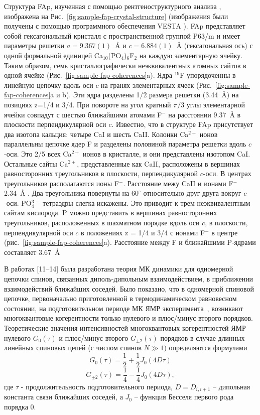 Структура FAp, изученная с помощью рентгеноструктурного анализа \cite{Elliott1994}, изображена на Рис.~\ref{fig:sample-fap-crystal-structure} (изображения были получены с помощью программного обеспечения VESTA \cite{vesta}).
FAp представляет собой гексагональный кристалл с пространственной группой P63/m
и имеет параметры решетки $a=9.367(1)$~\r{A} и $c=6.884(1)$~\r{A}
(гексагональная ось) с одной формальной единицей Ca$_{10}$(PO$_4$)$_6$F$_2$ на каждую элементарную ячейку.
Таким образом, семь кристаллографически неэквивалентных атомных сайтов в одной ячейке (Рис.~\ref{fig:sample-fap-coherences}a).
Ядра $^{19}$F упорядоченны в линейную цепочку вдоль оси $c$ на гранях элементарных ячеек (Рис.~\ref{fig:sample-fap-coherences}a и b). Эти ядра разделены 1/2 размера решетки (3.44~\r{A}) на позициях z=1/4 и 3/4. При повороте на угол кратный $\pi/3$ углы элементарной ячейки совпадут с шестью ближайшими атомами F$^-$ на расстоянии 9.37~\r{A}   в плоскости перпендикулярной оси $c$. Известно, что в структуре FAp присутствует два изотопа кальция: четыре CaI и шесть CaII. Колонки Ca$^{2+}$ ионов параллельны цепочке ядер F и разделены половиной параметра решетки вдоль $c$-оси. Это 2/5 всех Ca$^{2+}$ ионов в кристалле, и они представлены изотопом CaI. Остальные сайты Ca$^{2+}$, представленные как CaII, расположены в вершинах равносторонних треугольников в плоскости, перпендикулярной $c$-оси. В центрах треугольников располагаются ионы F$^-$. Расстояние межу CaII и ионами F$^-$ 2.34~\r{A}  . Два треугольника повернуты на $60^\circ$ относительно друг друга вокруг $c$-оси. PO$_4^{3-}$ тетраэдры слегка искажены. Это приводит к трем неэквивалентным сайтам кислорода. P можно представить в вершинах равносторонних треугольников, расположенных в шахматном порядке вдоль оси $c$, в плоскости, перпендикулярной оси $c$ в положениях z = 1/4 и 3/4 с ионами F$^-$ в центре (рис.~\ref{fig:sample-fap-coherences}a). Расстояние между F и ближайшими P-ядрами составляет 3.67~\r{A}

В работах [11–14] была разработана теория МК динамики для одномерной цепочки спинов,
связанных диполь-дипольным взаимодействием,
в приближении взаимодействий ближайших соседей.
Было показано,
что в одномерной спиновой цепочке,
первоначально приготовленной в термодинамическом равновесном состоянии,
на подготовительном периоде МК ЯМР эксперимента~\cite{Baum1985},
возникают многоквантовые когерентности только нулевого и плюс/минус второго порядков.
%
Теоретические значения интенсивностей многоквантовых когерентностей ЯМР нулевого $G_0(\tau)$ и плюс/минус второго $G_{\pm2}(\tau)$ порядков
в случае длинных линейных спиновых цепей (с числом спинов $N \gg 1$) определяются формулами
%
\begin{equation}
    \label{eq:coher_g0}
    G_{0}(\tau) = \frac 1 2 + \frac 1 2 J_{0}(4D\tau)
\end{equation}
%
\begin{equation}
    \label{eq:coher_g2}
    G_{\pm2}(\tau) = \frac 1 4 - \frac 1 4 J_{0}(4D\tau),
\end{equation}
где $\tau$ - продолжительность подготовительного периода,
$D = D_{i, i+1}$ – дипольная константа связи ближайших соседей,
а $J_0$ – функция Бесселя первого рода порядка 0.

